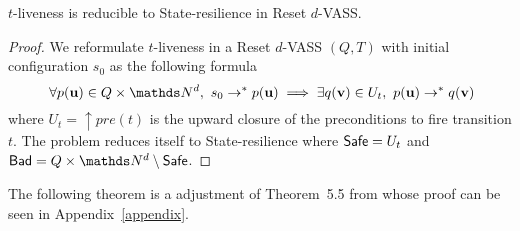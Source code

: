 \iffalse
\alain{ou alors $t=(u,u')$ such that $u \rightarrow u'$ mais alors c'est bizarre de nommer par la même lettre $t$ des couples différents $(u,u'), (v,v'),...$ dans un WSTS...ou alors on appelle transition un couple $(u,u')$ such that $u \rightarrow u'$ mais plus de lettre $t$...ou on définit un WSTS par un nombre fini de (shéma de ) transition $t_i$ qui sont compatibles par compatibilité mais ça contraint à un nombre fini (comme dans les VASS) ou alors on ne parle ici que des VASS et pas des WSTS mais ça suffira puisque state resilience pour VASS implique pour WSTS BREF il faut réfléchir à ce qu'est une transition...}

\mathieu{En train de penser que le mieux serait de définir la $t$-liveness pas pour les WSTS mais pour les (Reset) VASS uniquement et ensuite dire SRP indécidable dans WSTS car indécidable pour les Reset VASS.}

\fi


\begin{proposition}\label{reductions}
{\sc $t$-liveness} is reducible to {\sc State-resilience} in Reset $d$-VASS.
\end{proposition}


\begin{proof}
We reformulate $t$-liveness 
in a 
Reset $d$-VASS $(Q,T)$ 
with initial configuration $s_0$
as the following formula
$$ ~ \forall p(\textbf{u}) \in Q \times \N^d, 
~ s_0 \rightarrow^* p(\textbf{u}) \implies \exists q(\textbf{v}) \in U_t, ~ p(\textbf{u}) \rightarrow^{*} q(\textbf{v})$$  
where
$U_t=\uparrow pre(t)$ 
is the upward closure of the preconditions to fire transition $t$.  
The problem reduces itself to {\sc State-resilience}
where $\textsf{Safe} = U_t$ and $\Bad = Q \times \N^d \setminus \Safe$.
\end{proof}

The following theorem is a adjustment of Theorem~5.5 from \cite{peterson1981petri} whose proof can be seen in Appendix~\ref{appendix}.



